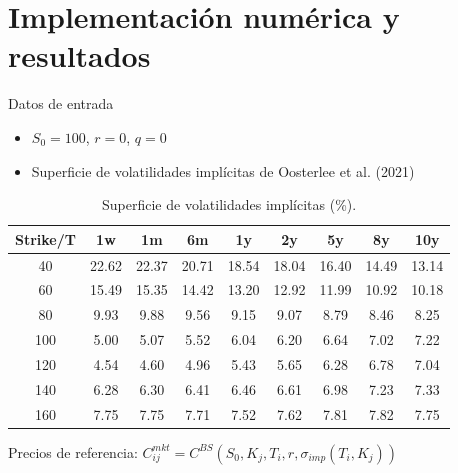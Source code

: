 \documentclass[8pt]{beamer}
\begin{document}
\section{Implementación numérica y resultados}

\begin{frame}{Datos de entrada}
    \begin{itemize}
        \item $S_0 = 100$, $r = 0$, $q = 0$
        \item Superficie de volatilidades implícitas de Oosterlee et al. (2021)
    \end{itemize}
    
    \vspace{0.2cm}
    \begin{table}
    \centering
    \scriptsize
    \begin{tabular}{c|cccccccc}
    \hline
    \textbf{Strike/T} & \textbf{1w} & \textbf{1m} & \textbf{6m} & \textbf{1y} & \textbf{2y} & \textbf{5y} & \textbf{8y} & \textbf{10y} \\
    \hline
    40  & 22.62 & 22.37 & 20.71 & 18.54 & 18.04 & 16.40 & 14.49 & 13.14 \\
    60  & 15.49 & 15.35 & 14.42 & 13.20 & 12.92 & 11.99 & 10.92 & 10.18 \\
    80  & 9.93  & 9.88  & 9.56  & 9.15  & 9.07  & 8.79  & 8.46  & 8.25  \\
    100 & 5.00  & 5.07  & 5.52  & 6.04  & 6.20  & 6.64  & 7.02  & 7.22  \\
    120 & 4.54  & 4.60  & 4.96  & 5.43  & 5.65  & 6.28  & 6.78  & 7.04  \\
    140 & 6.28  & 6.30  & 6.41  & 6.46  & 6.61  & 6.98  & 7.23  & 7.33  \\
    160 & 7.75  & 7.75  & 7.71  & 7.52  & 7.62  & 7.81  & 7.82  & 7.75  \\
    \hline
    \end{tabular}
    \caption{Superficie de volatilidades implícitas (\%).}
    \end{table}
    
    \pause
    \vspace{0.1cm}
    Precios de referencia: $C_{ij}^{mkt} = C^{BS}(S_0, K_j, T_i, r, \sigma_{imp}(T_i,K_j))$
\end{frame}
\end{document}
